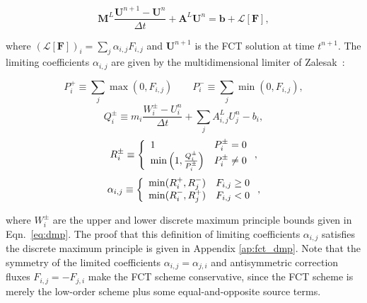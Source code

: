 \begin{equation}\label{eq:FCTscheme}
   \mathbf{M}^L\frac{\mathbf{U}^{n+1}-\mathbf{U}^n}{\Delta t}
      + \mathbf{A}^L\mathbf{U}^n
      = \mathbf{b} + \mathcal{L}[\mathbf{F}],
\end{equation}

\noindent
where $(\mathcal{L}[\mathbf{F}])_i = \sum\limits_j \alpha_{i,j}F_{i,j}$
and $\mathbf{U}^{n+1}$ is the FCT solution at time $t^{n+1}$. The
limiting coefficients $\alpha_{i,j}$ are given by the multidimensional
limiter of Zalesak~\cite{zalesak}:

\begin{equation}\label{eq:P_defs}
   P_i^+ \equiv \sum\limits_j\max(0,F_{i,j}) \qquad
   P_i^- \equiv \sum\limits_j\min(0,F_{i,j}),
\end{equation}
\begin{equation}\label{eq:Q_defs}
      Q_i^\pm \equiv m_i\frac{W_i^\pm-U_i^n}{\Delta t}
      + \sum\limits_j A_{i,j}^L U_j^n - b_i,
\end{equation}
\begin{equation}\label{eq:R_defs}
   R_i^\pm \equiv\left\{
      \begin{array}{l l}
         1                                          & P_i^\pm = 0\\
         \min\left(1,\frac{Q_i^\pm}{P_i^\pm}\right) & P_i^\pm \ne 0
      \end{array}
      \right.,
\end{equation}
\begin{equation}\label{eq:L_defs}
   \alpha_{i,j} \equiv\left\{
      \begin{array}{l l}
         \min(R_i^+,R_j^-) & F_{i,j} \geq 0\\
         \min(R_i^-,R_j^+) & F_{i,j} < 0
      \end{array}
      \right.,
\end{equation}

\noindent
where $W_i^\pm$ are the upper and lower discrete maximum principle bounds
given in Eqn.~\ref{eq:dmp}. The proof that this definition of limiting
coefficients $\alpha_{i,j}$
satisfies the discrete maximum principle is given in Appendix \ref{ap:fct_dmp}.
Note that the symmetry of the limited coefficients $\alpha_{i,j}=\alpha_{j,i}$ and
antisymmetric correction fluxes $F_{i,j}=-F_{j,i}$ make the FCT scheme conservative, since
the FCT scheme is merely the low-order scheme plus some equal-and-opposite source
terms.
